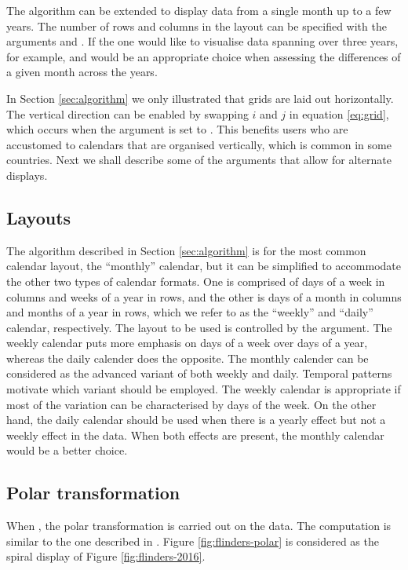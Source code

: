 \documentclass[article]{jss}
\begin{document}
The algorithm can be extended to display data from a single month up to
a few years. The number of rows and columns in the layout can be
specified with the arguments  and . If the one
would like to visualise data spanning over three years, for example,
 and  would be an appropriate choice when
assessing the differences of a given month across the years.

In Section \ref{sec:algorithm} we only illustrated that grids are laid
out horizontally. The vertical direction can be enabled by swapping
\(i\) and \(j\) in equation \ref{eq:grid}, which occurs when the
argument  is set to . This benefits users who are
accustomed to calendars that are organised vertically, which is common
in some countries. Next we shall describe some of the arguments that
allow for alternate displays.

\subsection{Layouts}\label{layouts}

The algorithm described in Section \ref{sec:algorithm} is for the most
common calendar layout, the ``monthly'' calendar, but it can be
simplified to accommodate the other two types of calendar formats. One
is comprised of days of a week in columns and weeks of a year in rows,
and the other is days of a month in columns and months of a year in
rows, which we refer to as the ``weekly'' and ``daily'' calendar,
respectively. The layout to be used is controlled by the 
argument. The weekly calendar puts more emphasis on days of a week over
days of a year, whereas the daily calender does the opposite. The
monthly calender can be considered as the advanced variant of both
weekly and daily. Temporal patterns motivate which variant should be
employed. The weekly calendar is appropriate if most of the variation
can be characterised by days of the week. On the other hand, the daily
calendar should be used when there is a yearly effect but not a weekly
effect in the data. When both effects are present, the monthly calendar
would be a better choice.

\subsection{Polar transformation}\label{polar-transformation}

When , the polar transformation is carried out on the
data. The computation is similar to the one described in
\citet{Wickham2012glyph}. Figure \ref{fig:flinders-polar} is considered
as the spiral display of Figure \ref{fig:flinders-2016}.
\end{document}
